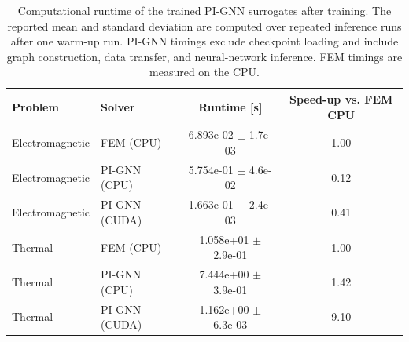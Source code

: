 \begin{table}[htbp]
    \centering
    \begin{tabular}{llcc}
        \hline
        Problem & Solver & Runtime [s] & Speed-up vs. FEM CPU \\
        \hline
        Electromagnetic & FEM (CPU) & 6.893e-02 $\pm$ 1.7e-03 & 1.00 \\
        Electromagnetic & PI-GNN (CPU) & 5.754e-01 $\pm$ 4.6e-02 & 0.12 \\
        Electromagnetic & PI-GNN (CUDA) & 1.663e-01 $\pm$ 2.4e-03 & 0.41 \\
        Thermal & FEM (CPU) & 1.058e+01 $\pm$ 2.9e-01 & 1.00 \\
        Thermal & PI-GNN (CPU) & 7.444e+00 $\pm$ 3.9e-01 & 1.42 \\
        Thermal & PI-GNN (CUDA) & 1.162e+00 $\pm$ 6.3e-03 & 9.10 \\
        \hline
    \end{tabular}
    \caption{Computational runtime of the trained PI-GNN surrogates after training. The reported mean and standard deviation are computed over repeated inference runs after one warm-up run. PI-GNN timings exclude checkpoint loading and include graph construction, data transfer, and neural-network inference. FEM timings are measured on the CPU.}
    \label{tab:computational_speedup}
\end{table}
